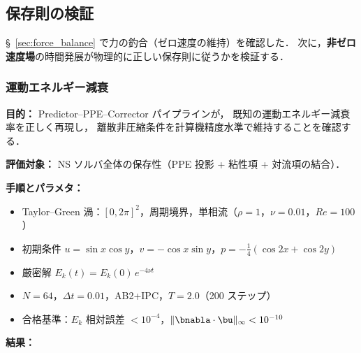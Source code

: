 %
\subsection{保存則の検証}
\label{sec:ns_conservation}

§~\ref{sec:force_balance} で力の釣合（ゼロ速度の維持）を確認した．
次に，\textbf{非ゼロ速度場}の時間発展が物理的に正しい保存則に従うかを検証する．

\subsubsection{運動エネルギー減衰}
\label{sec:energy_conservation}

\noindent\textbf{目的：}
Predictor--PPE--Corrector パイプラインが，
既知の運動エネルギー減衰率を正しく再現し，
離散非圧縮条件を計算機精度水準で維持することを確認する．

\noindent\textbf{評価対象：}
NS ソルバ全体の保存性（PPE 投影 + 粘性項 + 対流項の結合）．

\noindent\textbf{手順とパラメタ：}
\begin{itemize}[noitemsep]
  \item Taylor--Green 渦：$[0, 2\pi]^2$，周期境界，単相流（$\rho = 1$，$\nu = 0.01$，$\mathit{Re} = 100$）
  \item 初期条件 $u = \sin x\cos y$，$v = -\cos x\sin y$，$p = -\tfrac{1}{4}(\cos 2x + \cos 2y)$
  \item 厳密解 $E_k(t) = E_k(0)\,e^{-4\nu t}$
  \item $N = 64$，$\Delta t = 0.01$，AB2+IPC，$T = 2.0$（200 ステップ）
  \item 合格基準：$E_k$ 相対誤差 $< 10^{-4}$，$\|\bnabla\cdot\bu\|_\infty < 10^{-10}$
\end{itemize}

\noindent\textbf{結果：}


